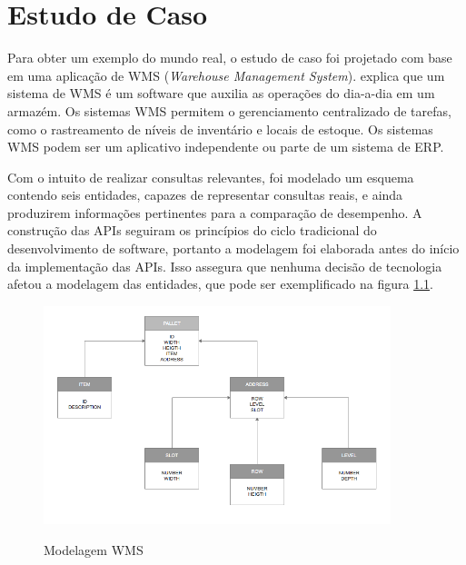 \chapter[Estudo de Caso]{Estudo de Caso}

Para obter um exemplo do mundo real, o estudo de caso foi projetado com base em uma aplicação de WMS (\textit{Warehouse Management System}).  explica que um sistema de WMS é um software que auxilia as operações do dia-a-dia em um armazém. Os sistemas WMS permitem o gerenciamento centralizado de tarefas, como o rastreamento de níveis de inventário e locais de estoque. Os sistemas WMS podem ser  um aplicativo independente ou parte de um sistema de ERP.

Com o intuito de realizar consultas relevantes, foi modelado um esquema contendo seis entidades, capazes de representar consultas reais, e ainda produzirem informações pertinentes para a comparação de desempenho. A construção das APIs seguiram os princípios do ciclo tradicional do desenvolvimento de software, portanto a modelagem foi elaborada antes do início da implementação das APIs. Isso assegura que nenhuma decisão de tecnologia afetou a modelagem das entidades, que pode ser exemplificado na figura \ref{fig:marlon}.

\begin{figure}[htbp]
\centering
\includegraphics[width=0.9\textwidth]{figuras/model.png}
\label{fig:marlon}
\caption{Modelagem WMS}
\author{fonte: Autor}
\end{figure}

